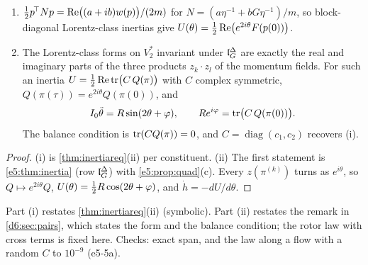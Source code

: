 \begin{proposition}
\label{e5:prop:rotorlaw}
\begin{enumerate}[label=(\roman*),leftmargin=2.2em]
\item $\tfrac12 p^{\!\top}Np=\operatorname{Re}\bigl((a+ib)w(p)\bigr)/(2m)$ for $N=(a\eta^{-1}+bG\eta^{-1})/m$, so block-diagonal Lorentz-class inertias give
$U(\theta)=\tfrac12\operatorname{Re}\bigl(e^{2i\theta}F(p(0))\bigr)$.
\item The Lorentz-class forms on $V_2^*$ invariant under $\mathfrak l_G^\Delta$ are exactly the real and imaginary parts of the three products $z_k\cdot z_l$ of the
momentum fields. For such an inertia $U=\tfrac12\operatorname{Re}\operatorname{tr}\bigl(C\,Q(\pi)\bigr)$ with $C$ complex symmetric, $Q(\pi(\tau))=e^{2i\theta}Q(\pi(0))$, and
\[
I_0\ddot\theta=R\sin(2\theta+\varphi),\qquad Re^{i\varphi}=\operatorname{tr}\bigl(C\,Q(\pi(0))\bigr).
\]
The balance condition is $\operatorname{tr}(CQ(\pi))=0$, and $C=\operatorname{diag}(c_1,c_2)$ recovers (i).
\end{enumerate}
\end{proposition}

\begin{proof}
(i) is \cref{thm:inertiareq}(ii) per constituent. (ii) The first statement is \cref{e5:thm:inertia} (row $\mathfrak l_G^\Delta$) with \cref{e5:prop:quad}(c). Every
$z(\pi^{(k)})$ turns as $e^{i\theta}$, so $Q\mapsto e^{2i\theta}Q$, $U(\theta)=\tfrac12 R\cos(2\theta+\varphi)$, and $\dot h=-dU/d\theta$.
\end{proof}

Part (i) restates \cref{thm:inertiareq}(ii) (symbolic). Part (ii) restates the remark in \cref{d6:sec:pairs}, which states the form and the
balance condition; the rotor law with cross terms is fixed here. Checks: exact span, and the law along a flow with a random $C$ to $10^{-9}$ (e5-5a).

